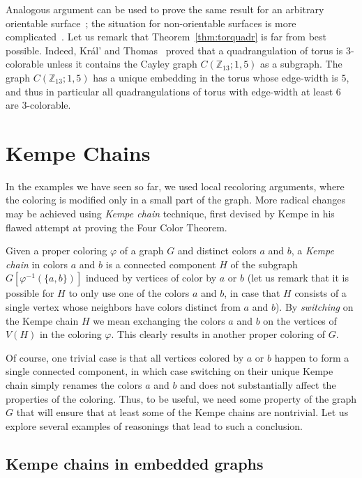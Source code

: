 \documentclass[12pt,twoside,openright,a4paper]{book}
\begin{document}
Analogous argument can be used to prove the same result for an arbitrary orientable surface~\cite{locplanq};
the situation for non-orientable surfaces is more complicated~\cite{MohSey,NakNegOta}.
Let us remark that Theorem~\ref{thm:torquadr} is far from best possible.  Indeed, Kr\'al' and Thomas~\cite{thomas2008coloring}
proved that a quadrangulation of torus is $3$-colorable unless it contains the Cayley graph $C(\mathbb{Z}_{13}; 1,5)$ as a subgraph.
The graph $C(\mathbb{Z}_{13}; 1,5)$ has a unique embedding in the torus whose edge-width is $5$, and thus in particular all quadrangulations
of torus with edge-width at least $6$ are $3$-colorable.

\section{Kempe Chains}

In the examples we have seen so far, we used local recoloring arguments, where the coloring is modified only in a small
part of the graph.  More radical changes may be achieved using \emph{Kempe chain} technique, first devised by Kempe
in his flawed attempt at proving the Four Color Theorem.

Given a proper coloring $\varphi$ of a graph $G$ and distinct colors $a$ and $b$, a \emph{Kempe chain} in colors $a$ and $b$
is a connected component $H$ of the subgraph $G[\varphi^{-1}(\{a,b\})]$ induced by vertices of color by $a$ or $b$
(let us remark that it is possible for $H$ to only use one of the colors $a$ and $b$, in case that $H$ consists of a single
vertex whose neighbors have colors distinct from $a$ and $b$).
By \emph{switching} on the Kempe chain $H$ we mean exchanging the colors $a$ and $b$ on the vertices of $V(H)$ in the coloring $\varphi$.
This clearly results in another proper coloring of $G$.

Of course, one trivial case is that all vertices colored by $a$ or $b$ happen to form a single connected component,
in which case switching on their unique Kempe chain simply renames the colors $a$ and $b$ and does not substantially
affect the properties of the coloring.  Thus, to be useful, we need some property of the graph $G$ that will ensure
that at least some of the Kempe chains are nontrivial.  Let us explore several examples of reasonings that lead to such a conclusion.

\subsection{Kempe chains in embedded graphs}
\end{document}
